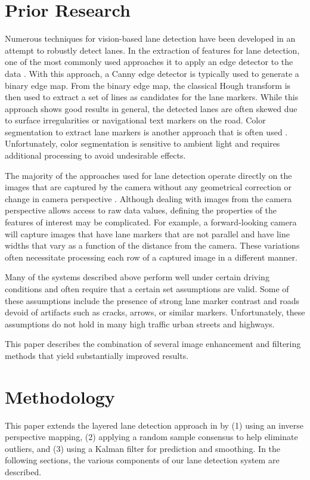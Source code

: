 \documentclass{article}
\begin{document}
\section{Prior Research}
\label{sec:prior}
Numerous techniques for vision-based lane detection have been developed in an attempt to robustly detect lanes.
In the extraction of features for lane detection, one of the most commonly used approaches it to apply an edge detector to the data \cite{assidiq_real_2008,wang_driver_2005}. With this approach, a Canny edge detector is typically used to generate a binary edge map. From the binary edge map, the classical Hough transform is then used to extract a set of lines as candidates for the lane markers.  While this approach shows good results in general, the detected lanes are often skewed due to surface irregularities or navigational text markers on the road. Color segmentation to extract lane markers is another approach that is often used \cite{sun_hsi_2006,chin_lane_2005}. Unfortunately, color segmentation is sensitive to ambient light and requires additional processing to avoid undesirable effects.

The majority of the approaches used for lane detection operate directly on the images that are captured by the camera without any geometrical correction or change in camera perspective \cite{borkar_layered_2009,assidiq_real_2008,sun_hsi_2006,wang_real-time_2006}.
Although dealing with images from the camera perspective allows access to raw data values, defining the properties of the features of interest may be complicated. For example, a forward-looking camera will capture images that have lane markers that are not parallel and have line widths that vary as a function of the distance from the camera.  These variations often necessitate processing each row of a captured image in a different manner.

Many of the systems described above perform well under certain driving conditions and often require that a certain set assumptions are valid.  Some of these assumptions include the  presence of strong lane marker contrast and roads devoid of artifacts such as cracks, arrows, or similar markers. Unfortunately, these assumptions do not hold in many high traffic urban streets and highways. 

This paper describes the combination of several image enhancement and filtering methods that yield substantially improved results.

\section{Methodology}
\label{sec:methodology}
This paper extends the layered lane detection approach in \cite{borkar_layered_2009} by (1) using an inverse perspective mapping, (2) applying a random sample consensus to help eliminate outliers, and (3) using a Kalman filter for prediction and smoothing.
In the following sections, the various components of our lane detection system are described.
\end{document}
